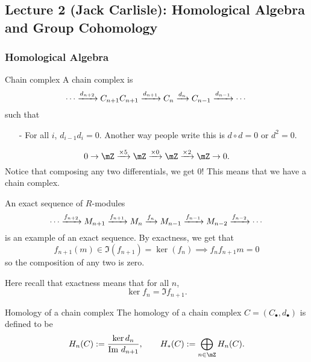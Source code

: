 \newpage

\subsection{Lecture 2 (Jack Carlisle): Homological Algebra and Group Cohomology}

\subsubsection{Homological Algebra}
\begin{definition}{Chain complex}{}
    A {chain complex} is $$\cdots \xrightarrow{d_{n+2}}C_{n+1}C_{n+1}\xrightarrow{d_{n+1}}C_{n}\xrightarrow{d_n}C_{n-1}\xrightarrow{d_{n-1}}\cdots$$ such that 
    \begin{itemize}
        \item[-] For all $i$, $d_{i-1}d_i = 0$. Another way people write this is $d\circ d =0$ or $d^2 =0$.  
    \end{itemize}
\end{definition}
\begin{example}{}{}\label{example:w1d2ex1}
    $$0\to \mZ\xr{\by 5} \mZ\xr{\by 0} \mZ\xr{\by 2}\mZ\to 0.$$
    Notice that composing any two differentials, we get 0! This means that we have a chain complex. 
\end{example}
\begin{example}{}{}\label{example:w1d2ex2}
    An exact sequence of $R$-modules $$\cdots \xrightarrow{f_{n+2}} M_{n+1}\xrightarrow{f_{n+1}} M_n\xrightarrow{f_{n}} M_{n-1}\xrightarrow{f_{n-1}} M_{n-2}\xrightarrow{f_{n-2}} \cdots$$ is an example of an exact sequence. By exactness, we get that $$f_{n+1}(m) \in \Im(f_{n+1}) = \ker(f_n)\implies f_nf_{n+1}m = 0$$ so the composition of any two is zero. 

    Here recall that exactness means that for all $n$, $$\ker f_n = \Im f_{n+1}.$$
\end{example}

\begin{definition}{Homology of a chain complex}{}
    The homology of a chain complex $C = (C_\bullet, d_\bullet)$ is defined to be $$H_n(C):= \frac{\ker d_n}{\Im d_{n+1}}, \qquad H_\ast(C):=\bigoplus_{n\in \mZ}H_n(C).$$
\end{definition}

